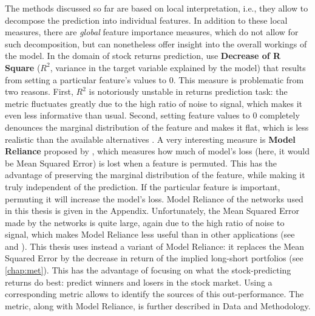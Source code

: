 			The methods discussed so far are based on local interpretation, i.e., they allow to decompose the prediction into individual features. In addition to these local measures, there are \textit{global} feature importance measures, which do not allow for such decomposition, but can nonetheless offer insight into the overall workings of the model. In the domain of stock returns prediction, \cite{gu2020empirical} use \textbf{Decrease of R Square} ($R^2$, variance in the target variable explained by the model) that results from setting a particular feature's values to 0. This measure is problematic from two reasons. First, $R^2$ is notoriously unstable in returns prediction task: the metric fluctuates greatly due to the high ratio of noise to signal, which makes it even less informative than usual. Second, setting feature values to 0 completely denounces the marginal distribution of the feature and makes it flat, which is less realistic than the available alternatives \citep{fisher2019all}. A very interesting measure is \textbf{Model Reliance} proposed by \citep{fisher2019all},  which measures how much of model's loss (here, it would be Mean Squared Error) is lost when a feature is permuted. This has the advantage of preserving the marginal distribution of the feature, while making it truly independent of the prediction. If the particular feature is important, permuting it will increase the model's loss. Model Reliance of the networks used in this thesis is given in the Appendix. Unfortunately, the Mean Squared Error made by the networks is quite large, again due to the high ratio of noise to signal, which makes Model Reliance less useful than in other applications (see \cite{fisher2019all} and \cite{molnar2020interpretable}). This thesis uses instead a variant of Model Reliance: it replaces the Mean Squared Error by the decrease in return of the implied long-short portfolios (see \ref{chap:met}). This has the advantage of focusing on what the stock-predicting returns do best: predict winners and losers in the stock market. Using a corresponding metric allows to identify the sources of this out-performance. The metric, along with Model Reliance, is further described in Data and Methodology. 		

			
			
		
		 

	

